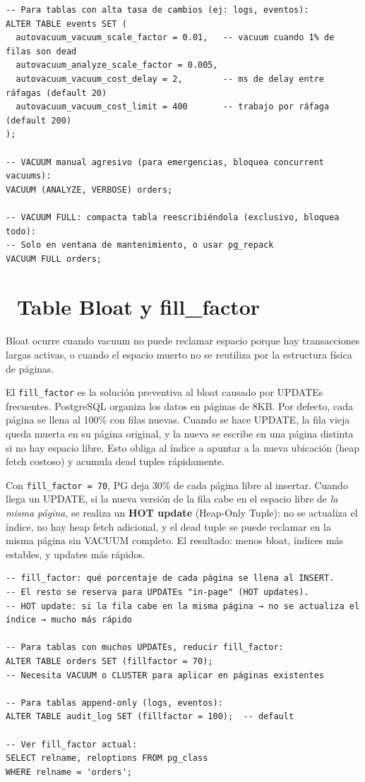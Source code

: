 \begin{lstlisting}[caption={Tuning de autovacuum por tabla}]
-- Para tablas con alta tasa de cambios (ej: logs, eventos):
ALTER TABLE events SET (
  autovacuum_vacuum_scale_factor = 0.01,   -- vacuum cuando 1% de filas son dead
  autovacuum_analyze_scale_factor = 0.005,
  autovacuum_vacuum_cost_delay = 2,        -- ms de delay entre ráfagas (default 20)
  autovacuum_vacuum_cost_limit = 400       -- trabajo por ráfaga (default 200)
);

-- VACUUM manual agresivo (para emergencias, bloquea concurrent vacuums):
VACUUM (ANALYZE, VERBOSE) orders;

-- VACUUM FULL: compacta tabla reescribiéndola (exclusivo, bloquea todo):
-- Solo en ventana de mantenimiento, o usar pg_repack
VACUUM FULL orders;
\end{lstlisting}

\section[Table Bloat y fill\_factor]{~Table Bloat y fill\_factor}

Bloat ocurre cuando vacuum no puede reclamar espacio porque hay transacciones largas activas, o cuando el espacio muerto no se reutiliza por la estructura física de páginas.

El \texttt{fill\_factor} es la solución preventiva al bloat causado por UPDATEs frecuentes.
PostgreSQL organiza los datos en páginas de 8KB. Por defecto, cada página se llena al 100\% con filas nuevas.
Cuando se hace UPDATE, la fila vieja queda muerta en su página original, y la nueva se escribe en una página distinta si no hay espacio libre.
Esto obliga al índice a apuntar a la nueva ubicación (heap fetch costoso) y acumula dead tuples rápidamente.

Con \texttt{fill\_factor = 70}, PG deja 30\% de cada página libre al insertar.
Cuando llega un UPDATE, si la nueva versión de la fila cabe en el espacio libre de \emph{la misma página}, se realiza un \textbf{HOT update} (Heap-Only Tuple): no se actualiza el índice, no hay heap fetch adicional, y el dead tuple se puede reclamar en la misma página sin VACUUM completo.
El resultado: menos bloat, índices más estables, y updates más rápidos.

\begin{lstlisting}[caption={fill\_factor para tablas con muchos UPDATEs}]
-- fill_factor: qué porcentaje de cada página se llena al INSERT.
-- El resto se reserva para UPDATEs "in-page" (HOT updates).
-- HOT update: si la fila cabe en la misma página → no se actualiza el índice → mucho más rápido

-- Para tablas con muchos UPDATEs, reducir fill_factor:
ALTER TABLE orders SET (fillfactor = 70);
-- Necesita VACUUM o CLUSTER para aplicar en páginas existentes

-- Para tablas append-only (logs, eventos):
ALTER TABLE audit_log SET (fillfactor = 100);  -- default

-- Ver fill_factor actual:
SELECT relname, reloptions FROM pg_class
WHERE relname = 'orders';
\end{lstlisting}

